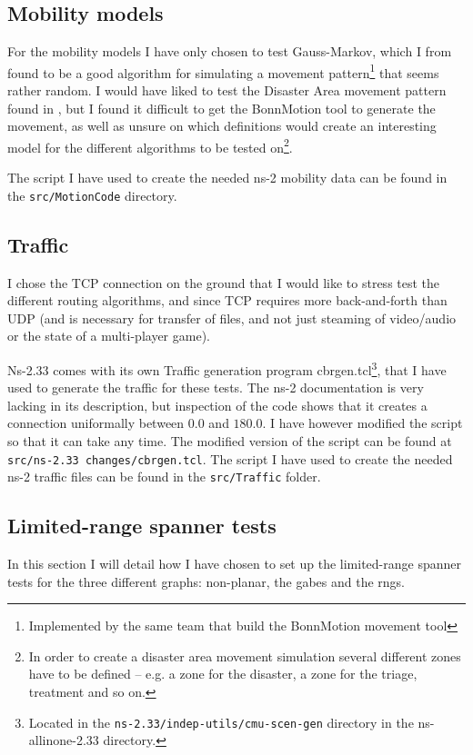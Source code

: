\subsection{Mobility models}
\label{section:mobili-ty_model}
For the mobility models I have only chosen to test Gauss-Markov, which I from \cite{MobilityAdHocResearch} found to be a good algorithm for simulating a movement pattern\footnote{Implemented by the same team that build the BonnMotion movement tool} that seems rather random. I would have liked to test the Disaster Area movement pattern found in \cite{disasterArea}, but I found it difficult to get the BonnMotion tool to generate the movement, as well as unsure on which definitions would create an interesting model for the different algorithms to be tested on\footnote{In order to create a disaster area movement simulation several different zones have to be defined -- e.g. a zone for the disaster, a zone for the triage, treatment and so on.}. 

The script I have used to create the needed ns-2 mobility data can be found in the \texttt{src/MotionCode} directory.

\subsection{Traffic}
\label{section:traffic_model}
I chose the TCP connection on the ground that I would like to stress test the different routing algorithms, and since TCP requires more back-and-forth than UDP (and is necessary for transfer of files, and not just steaming of video/audio or the state of a multi-player game).

Ns-2.33 comes with its own Traffic generation program cbrgen.tcl\footnote{Located in the \texttt{ns-2.33/indep-utils/cmu-scen-gen} directory in the ns-allinone-2.33 directory.}, that I have used to generate the traffic for these tests. The ns-2 documentation is very lacking in its description, but inspection of the code shows that it creates a connection uniformally between $0.0$ and $180.0$. I have however modified the script so that it can take any time. The modified version of the script can be found at \texttt{src/ns-2.33 changes/cbrgen.tcl}. The script I have used to create the needed ns-2 traffic files can be found in the \texttt{src/Traffic} folder.

\subsection{Limited-range spanner tests}
\label{section:test_desc_spanners}
In this section I will detail how I have chosen to set up the limited-range spanner tests for the three different graphs: non-planar, the \acp{gabe} and the \acp{rng}.

